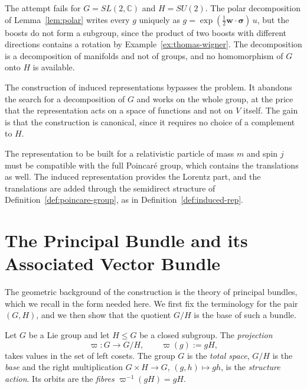 	The attempt fails for $G=SL(2,\mathbb{C})$ and $H=SU(2)$. The polar decomposition of Lemma~\ref{lem:polar} writes every $g$ uniquely as $g=\exp(\tfrac12\mathbf{w}\cdot\boldsymbol{\sigma})\,u$, but the boosts do not form a subgroup, since the product of two boosts with different directions contains a rotation by Example~\ref{ex:thomas-wigner}. The decomposition is a decomposition of manifolds and not of groups, and no homomorphism of $G$ onto $H$ is available.
	
	The construction of induced representations bypasses the problem. It abandons the search for a decomposition of $G$ and works on the whole group, at the price that the representation acts on a space of functions and not on $V$ itself. The gain is that the construction is canonical, since it requires no choice of a complement to $H$.
	
	\begin{remark}\label{rem:induced-motivation}
		The representation to be built for a relativistic particle of mass $m$ and spin $j$ must be compatible with the full Poincar\'e group, which contains the translations as well. The induced representation provides the Lorentz part, and the translations are added through the semidirect structure of Definition~\ref{def:poincare-group}, as in Definition~\ref{def:induced-rep}.
	\end{remark}
	
	\section{The Principal Bundle and its Associated Vector Bundle}
	\label{sec:principal-bundle}
	
	The geometric background of the construction is the theory of principal bundles, which we recall in the form needed here. We first fix the terminology for the pair $(G,H)$, and we then show that the quotient $G/H$ is the base of such a bundle.
	
	\begin{definition}\label{def:principal-bundle}
		Let $G$ be a Lie group and let $H\le G$ be a closed subgroup. The \emph{projection}
		\begin{equation}\label{eq:principal-projection}
			\varpi:G\longrightarrow G/H,\qquad \varpi(g):=gH,
		\end{equation}
		takes values in the set of left cosets. The group $G$ is the \emph{total space}, $G/H$ is the \emph{base} and the right multiplication $G\times H\to G$, $(g,h)\mapsto gh$, is the \emph{structure action}. Its orbits are the \emph{fibres} $\varpi^{-1}(gH)=gH$.
	\end{definition}
	
